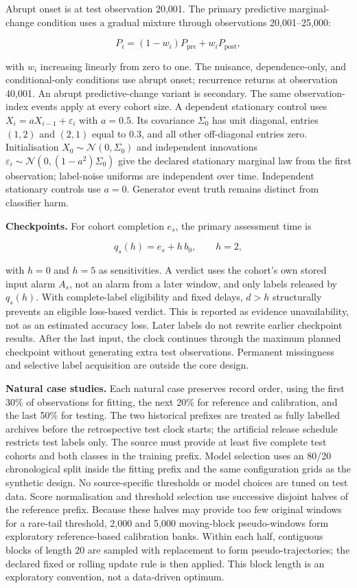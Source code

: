 \documentclass[
]{article}
\begin{document}
Abrupt onset is at test observation 20,001. The primary predictive
marginal-change condition uses a gradual mixture through observations
20,001--25,000:

\[
P_i=(1-w_i)P_{\mathrm{pre}}+w_iP_{\mathrm{post}},
\]

with \(w_i\) increasing linearly from zero to one. The nuisance,
dependence-only, and conditional-only conditions use abrupt onset;
recurrence returns at observation 40,001. An abrupt predictive-change
variant is secondary. The same observation-index events apply at every
cohort size. A dependent stationary control uses
\(X_i=aX_{i-1}+\varepsilon_i\) with \(a=0.5\). Its covariance
\(\Sigma_0\) has unit diagonal, entries \((1,2)\) and \((2,1)\) equal to
0.3, and all other off-diagonal entries zero. Initialisation
\(X_0\sim\mathcal{N}(0,\Sigma_0)\) and independent innovations
\(\varepsilon_i\sim\mathcal{N}(0,(1-a^2)\Sigma_0)\) give the declared
stationary marginal law from the first observation; label-noise uniforms
are independent over time. Independent stationary controls use \(a=0\).
Generator event truth remains distinct from classifier harm.

\textbf{Checkpoints.} For cohort completion \(e_s\), the primary
assessment time is

\[
q_s(h)=e_s+h\,b_0,
\qquad h=2,
\]

with \(h=0\) and \(h=5\) as sensitivities. A verdict uses the cohort's
own stored input alarm \(A_s\), not an alarm from a later window, and
only labels released by \(q_s(h)\). With complete-label eligibility and
fixed delays, \(d>h\) structurally prevents an eligible loss-based
verdict. This is reported as evidence unavailability, not as an
estimated accuracy loss. Later labels do not rewrite earlier checkpoint
results. After the last input, the clock continues through the maximum
planned checkpoint without generating extra test observations. Permanent
missingness and selective label acquisition are outside the core design.

\textbf{Natural case studies.} Each natural case preserves record order,
using the first 30\% of observations for fitting, the next 20\% for
reference and calibration, and the last 50\% for testing. The two
historical prefixes are treated as fully labelled archives before the
retrospective test clock starts; the artificial release schedule
restricts test labels only. The source must provide at least five
complete test cohorts and both classes in the training prefix. Model
selection uses an 80/20 chronological split inside the fitting prefix
and the same configuration grids as the synthetic design. No
source-specific thresholds or model choices are tuned on test data.
Score normalisation and threshold selection use successive disjoint
halves of the reference prefix. Because these halves may provide too few
original windows for a rare-tail threshold, 2,000 and 5,000 moving-block
pseudo-windows form exploratory reference-based calibration banks.
Within each half, contiguous blocks of length 20 are sampled with
replacement to form pseudo-trajectories; the declared fixed or rolling
update rule is then applied. This block length is an exploratory
convention, not a data-driven optimum.
\end{document}
